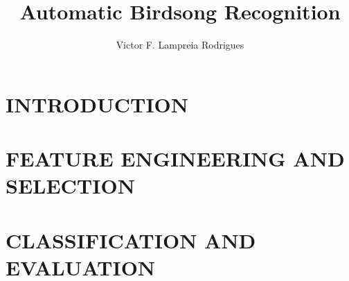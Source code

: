 \documentclass[12pt]{third-rep}
\title{Automatic Birdsong Recognition}
\author{Victor F. Lampreia Rodrigues}
\begin{document}
\dotitleandabstract

\tableofcontents
\listoffigures
\listoftables

\chapter{INTRODUCTION}





\chapter{FEATURE ENGINEERING AND SELECTION}




\chapter{CLASSIFICATION AND EVALUATION}







\appendix

\end{document}
